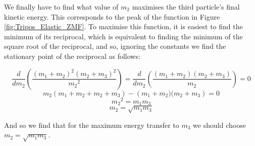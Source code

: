\begin{problem}
{We finally have to find what value of $m_2$ maximises the third particle's final kinetic energy. This corresponds to the peak of the function in Figure \ref{fig:Tripos_Elastic_ZMF}. To maximise this function, it is easiest to find the minimum of its reciprocal, which is equivalent to finding the minimum of the square root of the reciprocal, and so, ignoring the constants we find the stationary point of the reciprocal as follows:

\begin{equation*}\frac{d}{d{m_2}}\left(\frac{(m_{1}+m_{2})^{2}(m_{2}+m_{3})^{2}}{{m_{2}}^2}
\right)=\frac{d}{d{m_2}}\left(\frac{(m_{1}+m_{2})(m_{2}+m_{3})}{{m_{2}}}
\right)=0\end{equation*}
\begin{equation*}m_2\left(m_1 + m_2 + m_2 +m_3\right)-\left(m_{1}+m_{2})(m_{2}+m_{3}
\right)=0\end{equation*}
\begin{equation*}{m_2}^2=m_1m_3\end{equation*}
\begin{equation*}m_2=\sqrt{m_1m_3}\end{equation*}

And so we find that for the maximum energy transfer to $m_3$ we should choose $m_2=\sqrt{m_1m_3}$.
}
\end{problem}
%